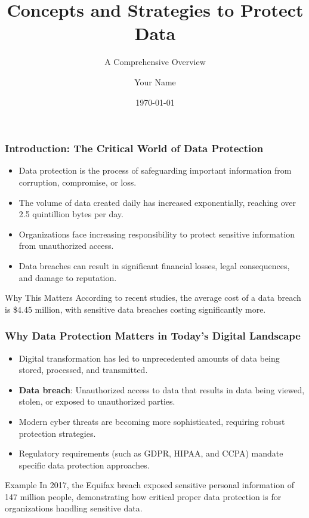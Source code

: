 \documentclass{beamer}
\title{Concepts and Strategies to Protect Data}
\subtitle{A Comprehensive Overview}
\author{Your Name}
\institute{University/Institution Name}
\date{\today}
\begin{document}
\begin{frame}
\titlepage
\end{frame}

\begin{frame}
\frametitle{Introduction: The Critical World of Data Protection}
\begin{itemize}
\item Data protection is the process of safeguarding important information from corruption, compromise, or loss.
\item The volume of data created daily has increased exponentially, reaching over 2.5 quintillion bytes per day.
\item Organizations face increasing responsibility to protect sensitive information from unauthorized access.
\item Data breaches can result in significant financial losses, legal consequences, and damage to reputation.
\end{itemize}

\begin{alertblock}{Why This Matters}
According to recent studies, the average cost of a data breach is \$4.45 million, with sensitive data breaches costing significantly more.
\end{alertblock}
\end{frame}

\begin{frame}
\frametitle{Why Data Protection Matters in Today's Digital Landscape}
\begin{itemize}
\item Digital transformation has led to unprecedented amounts of data being stored, processed, and transmitted.
\item \textbf{Data breach}: Unauthorized access to data that results in data being viewed, stolen, or exposed to unauthorized parties.
\item Modern cyber threats are becoming more sophisticated, requiring robust protection strategies.
\item Regulatory requirements (such as GDPR, HIPAA, and CCPA) mandate specific data protection approaches.
\end{itemize}

\begin{exampleblock}{Example}
In 2017, the Equifax breach exposed sensitive personal information of 147 million people, demonstrating how critical proper data protection is for organizations handling sensitive data.
\end{exampleblock}
\end{frame}
\end{document}
